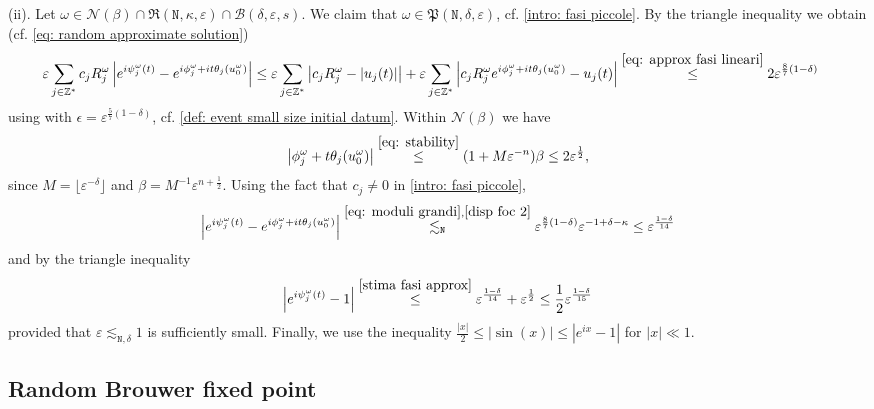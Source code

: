\documentclass[a4paper,10pt,reqno]{article}
\theoremstyle{definition}
\theoremstyle{plain}
\theoremstyle{plain}
\theoremstyle{definition}
\theoremstyle{plain}
\theoremstyle{plain}
\theoremstyle{plain}
\theoremstyle{definition}
\theoremstyle{definition}
\def \Z{\mathbb Z}
\def \B{\mathcal{B}}
\def \tN{\mathtt{N}}
\begin{document}
\medskip

(ii). Let $\omega \in \mathcal{N}(\beta) \cap \mathfrak{R}(\tN, \kappa, \varepsilon) \cap \B(\delta,\varepsilon,s)$.
We claim that $\omega \in \mathfrak{P}(\tN,\delta,\varepsilon)$, cf. \eqref{intro: fasi piccole}.
By the triangle inequality we obtain (cf. \eqref{eq: random approximate solution})
\begin{equation}\label{disp foc 2}
\begin{split}
\varepsilon \sum_{j \in \Z^*} c_j R_j^{\omega} \left \lvert e^{i \psi_j^{\omega}(t)} - e^{i \phi_j^{\omega} + i t \theta_j(u_0^{\omega})} \right \rvert &\le \varepsilon \sum_{j \in \Z^*} \left \lvert  c_j R_j^{\omega} - |u_j(t)| \right \rvert + \varepsilon \sum_{j \in \Z^*} \left \lvert c_j R_j^{\omega} e^{i \phi_j^{\omega} + i t \theta_j(u_0^{\omega})} - u_j(t) \right \rvert \stackrel{\eqref{eq: approx fasi lineari}}{\le} 2 \varepsilon^{\frac{8}{7}(1-\delta)}
\end{split}
\end{equation}
using  with $\epsilon = \varepsilon^{\frac{5}{7}(1-\delta)}$, cf. \eqref{def: event small size initial datum}.
Within $\mathcal{N}(\beta)$ we have 
\begin{equation} \label{stima fasi approx}
\left \lvert \phi_j^{\omega} + t \theta_j(u_0^{\omega}) \right \rvert \stackrel{\eqref{eq: stability}}{\le} (1+M \varepsilon^{-n}) \beta \le 2 \varepsilon^{\frac12},
\end{equation}
since $M = \lfloor \varepsilon^{-\delta} \rfloor$ and $\beta=M^{-1} \varepsilon^{n+\frac12}$. Using the fact that $c_j\neq 0$ in \eqref{intro: fasi piccole},
\[
\left \lvert e^{i \psi_j^{\omega}(t)} - e^{i \phi_j^{\omega} + i t \theta_j(u_0^{\omega})} \right \rvert \stackrel{\eqref{eq: moduli grandi}, \eqref{disp foc 2}}{\lesssim_{\tN}} \varepsilon^{\frac{8}{7}(1-\delta)} \varepsilon^{-1+\delta-\kappa} \le \varepsilon^{\frac{1-\delta}{14}}
\]
and by the triangle inequality
\[
\left \lvert e^{i \psi_j^{\omega}(t)} - 1 \right \rvert \stackrel{\eqref{stima fasi approx}}{\le} \varepsilon^{\frac{1-\delta}{14}} + \varepsilon^{\frac12} \le \frac12 \varepsilon^{\frac{1-\delta}{15}}
\]
provided that $\varepsilon \lesssim_{\tN,\delta} 1$ is sufficiently small. 
Finally, we use the inequality $\frac{|x|}{2} \le |\sin(x)| \le |e^{ix}-1|$ for $|x| \ll 1$. 

\hfill \qedsymbol

\subsection{Random Brouwer fixed point} \label{subsection: proof prop fixed point}
\end{document}
